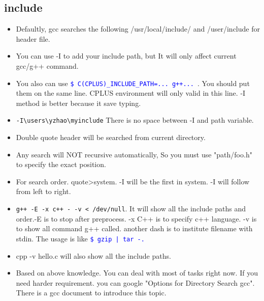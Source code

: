 \documentclass[a4paper,11pt,twoside]{book}
\newcommand{\linuxcommand}[1]{\texttt{\textcolor{blue}{\$ #1 \Pisymbol{psy}{191}}}}
\begin{document}
\subsection{include}
    \begin{itemize}		
    \item Defaultly, gcc searches the following /usr/local/include/ and /user/include for header file.				
	\item You can use -I to add your include path, but It will only affect current gcc/g++ command.

	\item You also can use \linuxcommand{C(CPLUS)\_INCLUDE\_PATH=... g++...}. You should put them on the same line. CPLUS environment will only valid in this line. -I method is better because it save typing.

	\item \verb=-I\users\yzhao\myinclude= There is no space between -I and path variable. 

		\item Double quote header will be searched from current directory. 

		\item Any search will NOT recursive automatically, So you must use "path/foo.h" to specify the exact position. 

		\item For search order. quote>system. -I will be the first in system. -I will follow from left to right.

		\item \verb=g++ -E -x c++ - -v < /dev/null=. It will show all the include paths and order.-E is to stop after preprocess. -x C++ is to specify c++ language. -v is to show all command g++ called. another dash is to institute filename with stdin. The usage is like \linuxcommand{gzip | tar -. } 

		\item cpp -v hello.c will also show all the include paths. 

		\item Based on above knowledge. You can deal with most of tasks right now. If you need harder requirement. you can google "Options for Directory Search gcc". There is a gcc document to introduce this topic.  
		
			\end{itemize}
\end{document}
